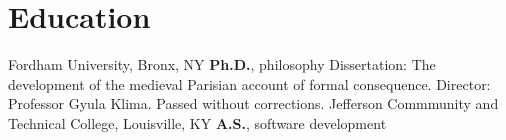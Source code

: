 \vspace*{0.4cm}
\section{Education}
{%
	Fordham University, Bronx, NY}
{%
	\textbf{Ph.D.}, philosophy}
{%
	Dissertation: The development of the medieval Parisian account of formal consequence. Director: Professor Gyula Klima. Passed without corrections.}
%
{%
	Jefferson Commmunity and Technical College, Louisville, KY}
{%
	\textbf{A.S.}, software development}
{}
